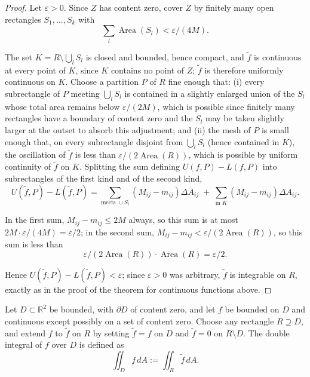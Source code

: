 \begin{proof}
Let $\varepsilon > 0$. Since $Z$ has content zero, cover $Z$ by finitely many open rectangles $S_1,\dots,S_k$ with
\[
\sum_l \operatorname{Area}(S_l) < \varepsilon/(4M).
\]

The set $K = R \setminus \bigcup_l S_l$ is closed and bounded, hence compact, and $\tilde{f}$ is continuous at every point of $K$, since $K$ contains no point of $Z$; $\tilde{f}$ is therefore uniformly continuous on $K$. Choose a partition $P$ of $R$ fine enough that: (i) every subrectangle of $P$ meeting $\bigcup_l S_l$ is contained in a slightly enlarged union of the $S_l$ whose total area remains below $\varepsilon/(2M)$, which is possible since finitely many rectangles have a boundary of content zero and the $S_l$ may be taken slightly larger at the outset to absorb this adjustment; and (ii) the mesh of $P$ is small enough that, on every subrectangle disjoint from $\bigcup_l S_l$ (hence contained in $K$), the oscillation of $\tilde f$ is less than $\varepsilon/(2\operatorname{Area}(R))$, which is possible by uniform continuity of $\tilde f$ on $K$. Splitting the sum defining $U(f,P)-L(f,P)$ into subrectangles of the first kind and of the second kind,
\[
U(\tilde f,P) - L(\tilde f,P) = \sum_{\text{meets } \cup S_l} (M_{ij}-m_{ij})\Delta A_{ij} \;+\; \sum_{\text{in } K} (M_{ij}-m_{ij}) \Delta A_{ij}.
\]

In the first sum, $M_{ij}-m_{ij} \leq 2M$ always, so this sum is at most $2M \cdot \varepsilon/(4M) = \varepsilon/2$; in the second sum, $M_{ij}-m_{ij} < \varepsilon/(2\operatorname{Area}(R))$, so this sum is less than
\[
\varepsilon/(2\operatorname{Area}(R)) \cdot \operatorname{Area}(R) = \varepsilon/2.
\]

Hence $U(\tilde f,P)-L(\tilde f,P) < \varepsilon$; since $\varepsilon>0$ was arbitrary, $\tilde f$ is integrable on $R$, exactly as in the proof of the theorem for continuous functions above.
\end{proof}

\begin{definition}
Let $D \subset \mathbb{R}^2$ be bounded, with $\partial D$ of content zero, and let $f$ be bounded on $D$ and continuous except possibly on a set of content zero. Choose any rectangle $R \supseteq D$, and extend $f$ to $\tilde f$ on $R$ by setting $\tilde f = f$ on $D$ and $\tilde f = 0$ on $R \setminus D$. The double integral of $f$ over $D$ is defined as
\[
\iint_D f\, dA := \iint_R \tilde f\, dA.
\]

\end{definition}

